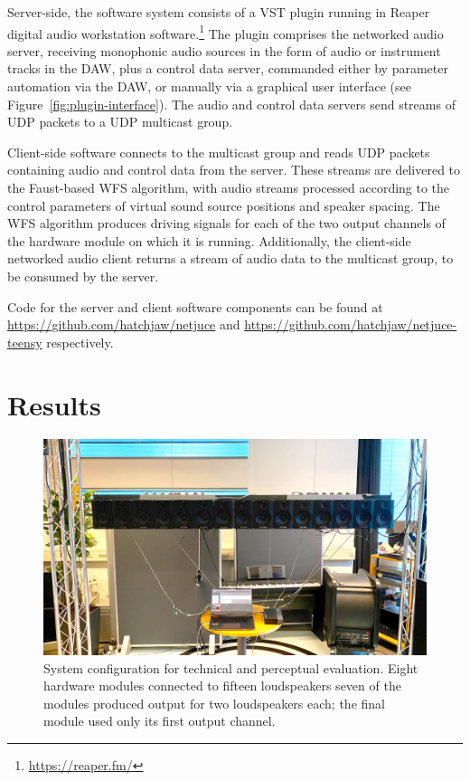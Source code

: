 \documentclass[utf8]{FrontiersinHarvard}
\newcommand{\figref}[1]{Figure~\ref{#1}}
\begin{document}
    Server-side, the software system consists of a VST plugin running in Reaper
    digital audio workstation software.\footnote{\url{https://reaper.fm/}}
    The plugin comprises the networked audio server, receiving monophonic audio
    sources in the form of audio or instrument tracks in the DAW, plus a control
    data server, commanded either by parameter automation via the DAW, or manually
    via a graphical user interface (see \figref{fig:plugin-interface}).
    The audio and control data servers send streams of UDP packets to a UDP
    multicast group.

    Client-side software connects to the multicast group and reads UDP packets
    containing audio and control data from the server.
    These streams are delivered to the Faust-based WFS algorithm, with audio
    streams processed according to the control parameters of virtual sound source
    positions and speaker spacing.
    The WFS algorithm produces driving signals for each of the two output channels
    of the hardware module on which it is running.
    Additionally, the client-side networked audio client returns a stream of audio
    data to the multicast group, to be consumed by the server.

    Code for the server and client software components can be found at
    \url{https://github.com/hatchjaw/netjuce} and
    \url{https://github.com/hatchjaw/netjuce-teensy} respectively.


    \section{Results}\label{sec:results}

    \begin{figure}[ht]
        \centering
        \includegraphics[width=\textwidth]{figures/eval-setup}
        \caption{
            System configuration for technical and perceptual evaluation.
            Eight hardware modules connected to fifteen loudspeakers \textemdash{}
            seven of the modules produced output for two loudspeakers each; the
            final module used only its first output channel.
        }
        \label{fig:eval-setup}
    \end{figure}
\end{document}
